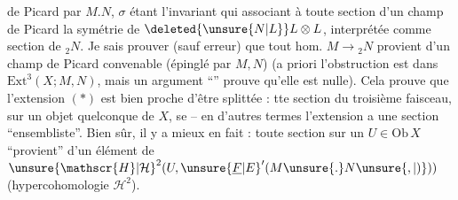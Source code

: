 \margin{\mbox{-- --}}

 de Picard  par $M.N$, $\sigma$ étant l'invariant qui  associant à toute section  d'un champ de Picard la symétrie de $\deleted{\unsure{N|L}}L\otimes L$, interprétée comme section de ${}_{2}N$. Je sais prouver (sauf erreur) que tout hom. $M\to{}_{2}N$ provient d'un champ de Picard convenable (épinglé par $M,N$) (a priori l'obstruction est dans $\mathrm{Ext}^{3}(X;M,N)$, mais un argument ``'' prouve qu'elle est nulle). Cela prouve que l'extension $(*)$ est bien proche d'être splittée :  tte section du troisième faisceau, sur un objet quelconque de $X$, se  -- en d'autres termes l'extension a une section ``ensembliste''. Bien sûr, il y a mieux en fait : toute section sur un $U\in\mathrm{Ob}\,X$ ``provient'' d'un élément de ${\unsure{\mathscr{H}|\mathcal{H}}}^{2}(U,{\unsure{\underline{F}|E}}'(M\unsure{.}N\unsure{,|)}))$ (hypercohomologie $\mathscr{H}^{2}$).


